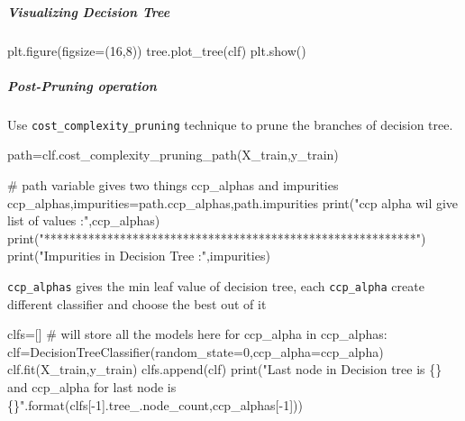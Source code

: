\documentclass[
  letterpaper,
  DIV=11,
  numbers=noendperiod]{scrartcl}
\let\oldsubparagraph\subparagraph
\renewcommand{\subparagraph}[1]{\oldsubparagraph{#1}\mbox{}}
\newenvironment{Shaded}{\begin{snugshade}}{\end{snugshade}}
\newcommand{\BuiltInTok}[1]{\textcolor[rgb]{0.00,0.23,0.31}{#1}}
\newcommand{\CommentTok}[1]{\textcolor[rgb]{0.37,0.37,0.37}{#1}}
\newcommand{\ControlFlowTok}[1]{\textcolor[rgb]{0.00,0.23,0.31}{#1}}
\newcommand{\DecValTok}[1]{\textcolor[rgb]{0.68,0.00,0.00}{#1}}
\newcommand{\KeywordTok}[1]{\textcolor[rgb]{0.00,0.23,0.31}{#1}}
\newcommand{\NormalTok}[1]{\textcolor[rgb]{0.00,0.23,0.31}{#1}}
\newcommand{\OperatorTok}[1]{\textcolor[rgb]{0.37,0.37,0.37}{#1}}
\newcommand{\SpecialCharTok}[1]{\textcolor[rgb]{0.37,0.37,0.37}{#1}}
\newcommand{\StringTok}[1]{\textcolor[rgb]{0.13,0.47,0.30}{#1}}
\begin{document}
\subparagraph{Visualizing Decision
Tree}\label{visualizing-decision-tree}

\begin{Shaded}
\begin{Highlighting}[]
\NormalTok{plt.figure(figsize}\OperatorTok{=}\NormalTok{(}\DecValTok{16}\NormalTok{,}\DecValTok{8}\NormalTok{))}
\NormalTok{tree.plot\_tree(clf)}
\NormalTok{plt.show()}
\end{Highlighting}
\end{Shaded}

\subparagraph{Post-Pruning operation}\label{post-pruning-operation}

Use \texttt{cost\_complexity\_pruning} technique to prune the branches
of decision tree.

\begin{Shaded}
\begin{Highlighting}[]
\NormalTok{path}\OperatorTok{=}\NormalTok{clf.cost\_complexity\_pruning\_path(X\_train,y\_train)}

\CommentTok{\# path variable gives two things ccp\_alphas and impurities}
\NormalTok{ccp\_alphas,impurities}\OperatorTok{=}\NormalTok{path.ccp\_alphas,path.impurities}
\BuiltInTok{print}\NormalTok{(}\StringTok{"ccp alpha wil give list of values :"}\NormalTok{,ccp\_alphas)}
\BuiltInTok{print}\NormalTok{(}\StringTok{"***********************************************************"}\NormalTok{)}
\BuiltInTok{print}\NormalTok{(}\StringTok{"Impurities in Decision Tree :"}\NormalTok{,impurities)}
\end{Highlighting}
\end{Shaded}

\texttt{ccp\_alphas} gives the min leaf value of decision tree, each
\texttt{ccp\_alpha} create different classifier and choose the best out
of it

\begin{Shaded}
\begin{Highlighting}[]
\NormalTok{clfs}\OperatorTok{=}\NormalTok{[]   }\CommentTok{\# will store all the models here}
\ControlFlowTok{for}\NormalTok{ ccp\_alpha }\KeywordTok{in}\NormalTok{ ccp\_alphas:}
\NormalTok{    clf}\OperatorTok{=}\NormalTok{DecisionTreeClassifier(random\_state}\OperatorTok{=}\DecValTok{0}\NormalTok{,ccp\_alpha}\OperatorTok{=}\NormalTok{ccp\_alpha)}
\NormalTok{    clf.fit(X\_train,y\_train)}
\NormalTok{    clfs.append(clf)}
\BuiltInTok{print}\NormalTok{(}\StringTok{"Last node in Decision tree is }\SpecialCharTok{\{\}}\StringTok{ and ccp\_alpha for last node is }\SpecialCharTok{\{\}}\StringTok{"}\NormalTok{.}\BuiltInTok{format}\NormalTok{(clfs[}\OperatorTok{{-}}\DecValTok{1}\NormalTok{].tree\_.node\_count,ccp\_alphas[}\OperatorTok{{-}}\DecValTok{1}\NormalTok{]))}
\end{Highlighting}
\end{Shaded}
\end{document}

